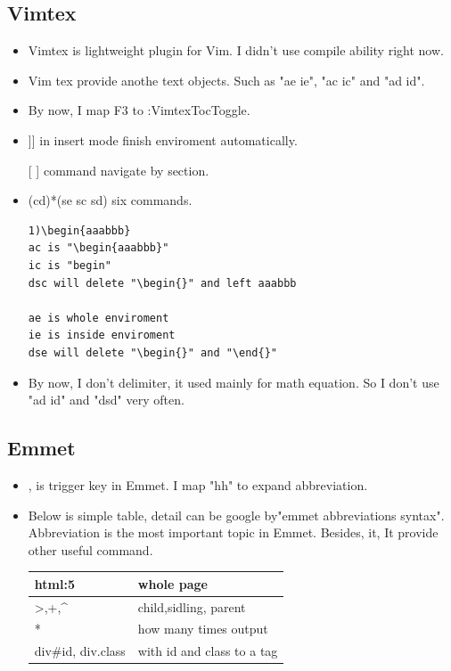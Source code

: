 \documentclass[a4paper,12pt,twoside]{book}
\begin{document}
\begin{itemize}
\subsection{Vimtex}
\begin{itemize}
		\item Vimtex is lightweight plugin for Vim. I didn't use compile ability right now. 
		\item Vim tex provide anothe text objects. Such as "ae ie", "ac ic" and "ad id". 
		\item By now, I map F3 to :VimtexTocToggle.
		\item ]] in insert mode finish enviroment automatically.
		\item [[ ]] command navigate by section.
		\item (cd)*(se sc sd) six commands. 
\begin{verbatim}
1)\begin{aaabbb}
ac is "\begin{aaabbb}"
ic is "begin"
dsc will delete "\begin{}" and left aaabbb

ae is whole enviroment
ie is inside enviroment
dse will delete "\begin{}" and "\end{}" 
\end{verbatim}
	\item By now, I don't delimiter, it used mainly for math equation. So I don't use "ad id" and "dsd" very often. 
			\end{itemize}

\subsection{Emmet}
\begin{itemize}
		\item <C-y>, is trigger key in Emmet. I map "hh" to expand abbreviation.

		\item Below is simple table, detail can be google by"emmet abbreviations syntax". Abbreviation is the most important topic in Emmet. Besides, it, It provide other useful command. 

\begin{tabular}{p{}|p{}}
\hline 
html:5  & whole page \\ 
\hline 
>,+,\^{} & child,sidling, parent  \\ 
\hline 
* &how many times output \\
\hline
div\#id, div.class & with id and class to a tag \\


\end{tabular}
\end{itemize}
\end{itemize}
\end{document}
